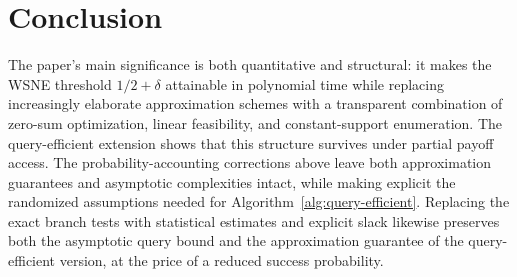 \section{Conclusion}

The paper's main significance is both quantitative and structural: it makes the WSNE threshold \(1/2+\delta\) attainable in polynomial time while replacing increasingly elaborate approximation schemes with a transparent combination of zero-sum optimization, linear feasibility, and constant-support enumeration. The query-efficient extension shows that this structure survives under partial payoff access. The probability-accounting corrections above leave both approximation guarantees and asymptotic complexities intact, while making explicit the randomized assumptions needed for Algorithm~\ref{alg:query-efficient}. Replacing the exact branch tests with statistical estimates and explicit slack likewise preserves both the asymptotic query bound and the approximation guarantee of the query-efficient version, at the price of a reduced success probability.
